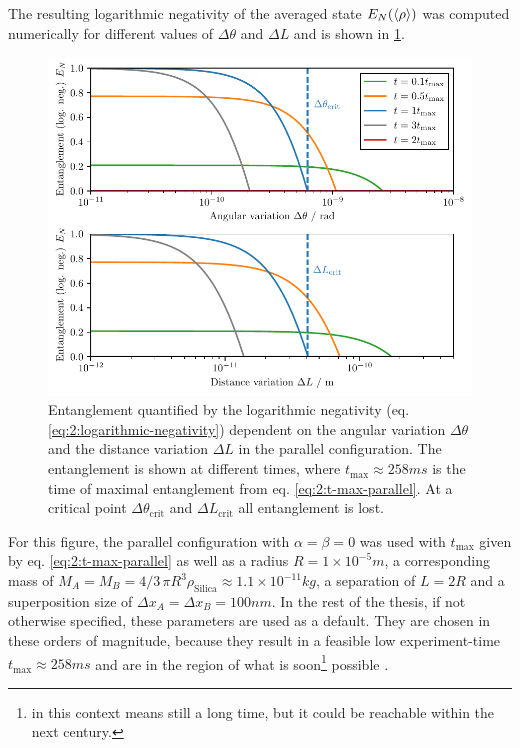 The resulting logarithmic negativity of the averaged state $E_N(\left\langle\rho\right\rangle)$ was computed numerically for different values of $\Delta \theta$ and $\Delta L$ and is shown in \cref{fig:4:EN-delta-theta}.
\begin{figure}[!htb]
  \centering
  \includegraphics[width=\textwidth]{./../figures/theta-variance/EN-deltaTheta-deltaL.pdf}
  \caption{Entanglement quantified by the logarithmic negativity (eq. \eqref{eq:2:logarithmic-negativity}) dependent on the angular variation $\Delta\theta$ and the distance variation $\Delta L$ in the parallel configuration. The entanglement is shown at different times, where $t_\mathrm{max} \approx 258\si{ms}$ is the time of maximal entanglement from eq. \eqref{eq:2:t-max-parallel}. At a critical point $\Delta \theta_\mathrm{crit}$ and $\Delta L_\mathrm{crit}$ all entanglement is lost.}
  \label{fig:4:EN-delta-theta}
\end{figure}
For this figure, the parallel configuration with $\alpha = \beta = 0$ was used with $t_\mathrm{max}$ given by eq. \eqref{eq:2:t-max-parallel} as well as a radius $R=1\times 10^{-5}\si{m}$, a corresponding mass of $M_A = M_B = 4/3\, \pi R^3 \rho_\mathrm{Silica} \approx 1.1\times 10^{-11}\si{kg}$, a separation of $L=2R$ and a superposition size of $\Delta x_A = \Delta x_B = 100\si{nm}$.
In the rest of the thesis, if not otherwise specified, these parameters are used as a default.
They are chosen in these orders of magnitude, because they result in a feasible low experiment-time $t_\mathrm{max}\approx 258\si{ms}$ and are in the region of what is soon\footnote{ in this context means still a long time, but it could be reachable within the next century.} possible \cite{Aspelmeyer_2024}.
